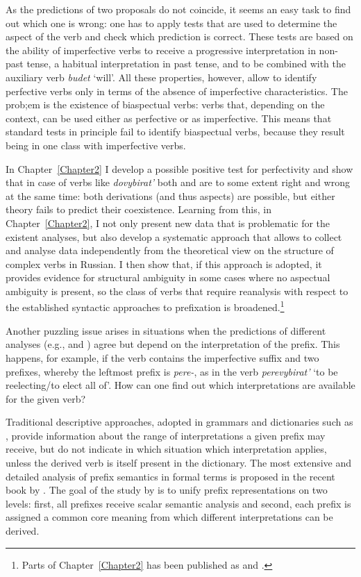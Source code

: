 As the predictions of two proposals do not coincide, it seems an easy task to find out which one is wrong: one has to apply tests that are used to determine the aspect of the verb and check which prediction is correct. These tests are based on the ability of imperfective verbs to receive a progressive interpretation in non-past tense, a habitual interpretation in past tense, and to be combined with the auxiliary verb \textit{budet} `will'. All these properties, however, allow to identify perfective verbs only in terms of the absence of imperfective characteristics. The prob;em is the existence of biaspectual verbs: verbs that, depending on the context, can be used either as perfective or as imperfective. This means that standard tests in principle fail to identify biaspectual verbs, because they result being in one class with imperfective verbs.

In Chapter~\ref{Chapter2} I develop a possible positive test for perfectivity and show that in case of verbs like \textit{dovybirat'} both \citet{Svenonius:04b} and \citet{Tatevosov:07} are to some extent right and wrong at the same time: both derivations (and thus aspects) are possible, but either theory fails to predict their coexistence. Learning from this, in Chapter~\ref{Chapter2}, I not only present new data that is problematic for the existent analyses, but also develop a systematic approach that allows to collect and analyse data independently from the theoretical view on the structure of complex verbs in Russian. I then show that, if this approach is adopted, it provides evidence for structural ambiguity in some cases where no aspectual ambiguity is present, so the class of verbs that require reanalysis with respect to the established syntactic approaches to prefixation is broadened.\footnote{Parts of Chapter~\ref{Chapter2} has been published as \citealt{ZinovaFilip:13} and \citealt{ZinovaOsswald:paper}.}

Another puzzling issue arises in situations when the predictions of different analyses (e.g., \citealt{Svenonius:04b} and \citealt{Tatevosov:07}) agree but depend on the interpretation of the prefix. This happens, for example, if the verb contains the imperfective suffix and two prefixes, whereby the leftmost prefix is \textit{pere-}, as in the verb \textit{perevybirat'} `to be reelecting/to elect all of'. How can one find out which interpretations are available for the given verb? 

Traditional descriptive approaches, adopted in grammars and dictionaries such as \citet{Shvedova:82}, provide information about the range of interpretations a given prefix may receive, but do not indicate in which situation which interpretation applies, unless the derived verb is itself present in the dictionary. The most extensive and detailed analysis of prefix semantics in formal terms is proposed in the recent book by \citet{Kagan:book}. The goal of the study by \citet{Kagan:book} is to unify prefix representations on two levels: first, all prefixes receive scalar semantic analysis and second, each prefix is assigned a common core meaning from which different interpretations can be derived. 


